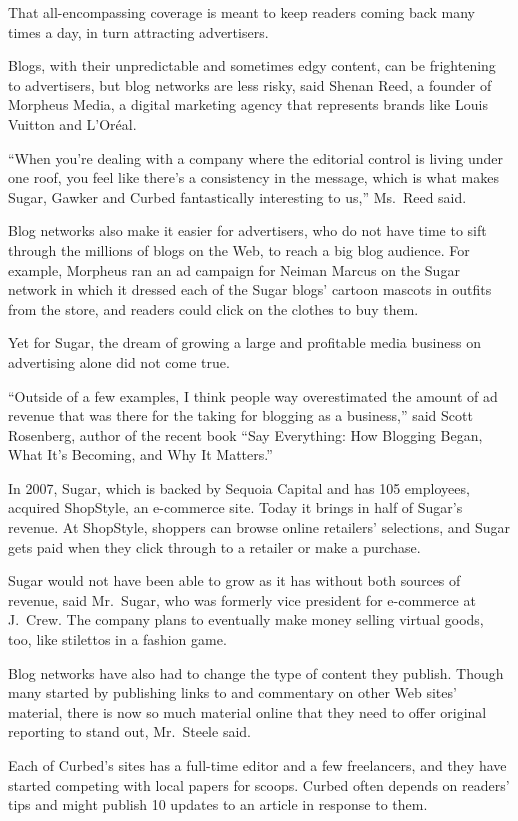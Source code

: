 ﻿\documentclass[12pt]{article}
\begin{document}
That all-encompassing coverage is meant to keep readers coming back many times a day, in turn
attracting advertisers.

Blogs, with their unpredictable and sometimes edgy\cite{edgy} content, can be frightening to
advertisers, but blog networks are less risky, said Shenan Reed, a founder of Morpheus Media, a
digital marketing agency that represents brands like Louis Vuitton and L'Or\'eal.

``When you're dealing with a company where the editorial control is living under one roof, you feel
like there's a consistency in the message, which is what makes Sugar, Gawker and Curbed
fantastically interesting to us,'' Ms.~Reed said.

Blog networks also make it easier for advertisers, who do not have time to sift through the millions
of blogs on the Web, to reach a big blog audience. For example, Morpheus ran an ad campaign for
Neiman Marcus on the Sugar network in which it dressed each of the Sugar blogs' cartoon mascots in
outfits from the store, and readers could click on the clothes to buy them.

Yet for Sugar, the dream of growing a large and profitable media business on advertising alone did
not come true.

``Outside of a few examples, I think people way overestimated the amount of ad revenue that was
there for the taking for blogging as a business,'' said Scott Rosenberg, author of the recent book
``Say Everything: How Blogging Began, What It's Becoming, and Why It Matters.''

In 2007, Sugar, which is backed by Sequoia Capital and has 105 employees, acquired ShopStyle, an
e-commerce site. Today it brings in half of Sugar's revenue. At ShopStyle, shoppers can browse
online retailers' selections, and Sugar gets paid when they click through to a retailer or make a
purchase.

Sugar would not have been able to grow as it has without both sources of revenue, said Mr.~Sugar,
who was formerly vice president for e-commerce at J.~Crew. The company plans to eventually make
money selling virtual goods, too, like stilettos in a fashion game.

Blog networks have also had to change the type of content they publish. Though many started by
publishing links to and commentary on other Web sites' material, there is now so much material
online that they need to offer original reporting to stand out, Mr.~Steele said.

Each of Curbed's sites has a full-time editor and a few freelancers, and they have started competing
with local papers for scoops. Curbed often depends on readers' tips and might publish 10 updates to
an article in response to them.
\end{document}
